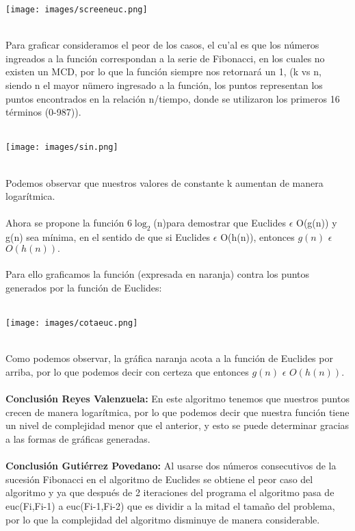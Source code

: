 \documentclass[12pt,twoside]{article}
\begin{document}
\centerline{\texttt{[image: images/screeneuc.png]}}\\
Para graficar consideramos el peor de los casos, el cu'al es que los n\'umeros ingreados a la funci\'on correspondan a la serie de Fibonacci, en los cuales no existen un MCD, por lo que la funci\'on siempre nos retornar\'a un 1, (k vs n, siendo n el mayor nümero ingresado a la funci\'on, los puntos representan los puntos encontrados en la relaci\'on n/tiempo, donde se utilizaron los primeros 16 t\'erminos (0-987)).\\\\
\centerline{\texttt{[image: images/sin.png]}}\\
Podemos observar que nuestros valores de constante k aumentan de manera logar\'itmica.\\\\
Ahora se propone la funci\'on 6$\log_2$(n)para demostrar que Euclides $\epsilon$ O(g(n)) y g(n) sea m\'inima, en el
sentido de que si Euclides $\epsilon$ O(h(n)), entonces $g(n)$ $\epsilon$ $O(h(n)).$\\\\
Para ello graficamos la funci\'on (expresada en naranja) contra los puntos generados por la funci\'on de Euclides:\\\\
\centerline{\texttt{[image: images/cotaeuc.png]}}\\
Como podemos observar, la gráfica naranja acota a la función de Euclides por arriba, por lo que podemos decir con certeza que entonces $g(n)$ $\epsilon$ $O(h(n)).$\\\\
{\bf Conclusi\'on Reyes Valenzuela:} En este algoritmo tenemos que nuestros puntos crecen de manera logar\'itmica, por lo que podemos decir que nuestra funci\'on tiene un nivel de complejidad menor que el anterior, y esto se puede determinar gracias a las formas de gr\'aficas generadas.\\\\
{\bf Conclusi\'on Guti\'errez Povedano:} Al usarse dos n\'umeros consecutivos de la sucesi\'on Fibonacci en el algoritmo de Euclides se
obtiene el peor caso del algoritmo y ya que despu\'es de 2 iteraciones del programa el algoritmo pasa de euc(Fi,Fi-1) a euc(Fi-1,Fi-2) que es dividir a la mitad el tamaño del problema, por lo que la complejidad del algoritmo disminuye de manera considerable.\\\\
\end{document}
